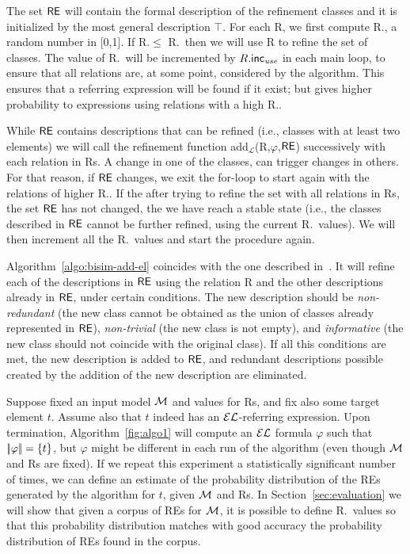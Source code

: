 The set $\textsf{RE}$ will contain the formal description of the refinement
classes and it is initialized by the most general description $\top$.
For each R, we first compute R.\randomuse, a random number in [0,1].
If R.\randomuse $\le$ R.\puse\ then we will use R to refine the set of
classes.  The value of R.\puse\ will be incremented by $R.\textsf{inc}_\emph{use}$ in
each main loop, to ensure that all relations are, at some point,
considered by the algorithm.  This ensures that a referring expression
will be found if it exist; but gives higher probability to expressions
using relations with a high R.\puse.
 
While $\textsf{RE}$ contains descriptions that can be refined (i.e., classes
with at least two elements) we will call the refinement function
add$_\mathcal{L}$(R,$\varphi$,$\textsf{RE}$) successively with each relation
in Rs. A change in one of the classes, can trigger changes in
others. For that reason, if $\textsf{RE}$ changes, we exit the for-loop to
start again with the relations of higher R.\puse. If the after trying
to refine the set with all relations in Rs, the set $\textsf{RE}$ has not
changed, the we have reach a stable state (i.e., the classes described
in $\textsf{RE}$ cannot be further refined, using the current R.\puse\
values). We will then increment all the R.\puse\ values and start the
procedure again.

Algorithm~\ref{algo:bisim-add-el} coincides with the one described
in~\cite{arec2:2008:Areces}.  It will refine each of the descriptions
in $\textsf{RE}$ using the relation R and the other descriptions already in
$\textsf{RE}$, under certain conditions. The new description should be
\emph{non-redundant} (the new class cannot be obtained as the union of
classes already represented in $\textsf{RE}$), \emph{non-trivial} (the new
class is not empty), and \emph{informative} (the new class should not
coincide with the original class).  If all this conditions are met,
the new description is added to $\textsf{RE}$, and redundant descriptions
possible created by the addition of the new description are
eliminated.

Suppose fixed an input model $\mathcal{M}$ and values for Rs, and fix also
some target element $t$.  Assume also that $t$ indeed has an
$\mathcal{EL}$-referring expression.  Upon termination,
Algorithm~\ref{fig:algo1} will compute an $\mathcal{EL}$ formula $\varphi$ such
that $|\!|\varphi|\!| = \{t\}$, but $\varphi$ might be different in
each run of the algorithm (even though $\mathcal{M}$ and Rs are fixed).  If we
repeat this experiment a statistically significant number of times, we
can define an estimate of the probability distribution of the REs
generated by the algorithm for $t$, given $\mathcal{M}$ and Rs. In
Section~\ref{sec:evaluation} we will show that given a corpus of REs
for $\mathcal{M}$, it is possible to define R.\puse\ values so that this
probability distribution matches with good accuracy the probability
distribution of REs found in the corpus.

